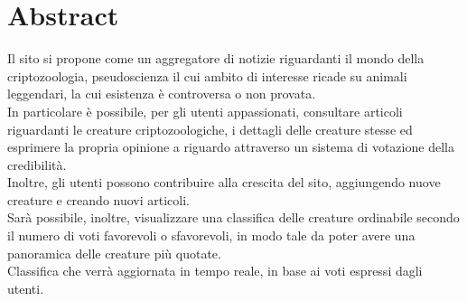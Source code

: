 \section{Abstract}
\label{sec:abstract}
Il sito si propone come un aggregatore di notizie riguardanti il mondo della criptozoologia, pseudoscienza il cui ambito di interesse ricade su animali leggendari, la cui esistenza è controversa o non provata. \\
In particolare è possibile, per gli utenti appassionati, consultare articoli riguardanti le creature criptozoologiche, i dettagli delle creature stesse ed esprimere la propria opinione a riguardo attraverso un sistema di votazione della credibilità. \\
Inoltre, gli utenti possono contribuire alla crescita del sito, aggiungendo nuove creature e creando nuovi articoli. \\
Sarà possibile, inoltre, visualizzare una classifica delle creature ordinabile secondo il numero di voti favorevoli o sfavorevoli, in modo tale da poter avere una panoramica delle creature più quotate. \\
Classifica che verrà aggiornata in tempo reale, in base ai voti espressi dagli utenti.